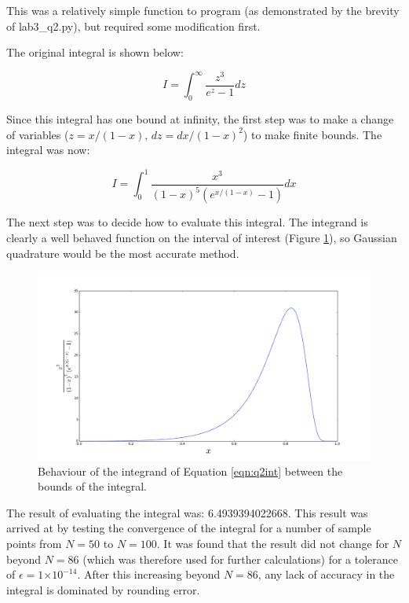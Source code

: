 \documentclass[a4paper,12pt]{article}
\providecommand{\e}[1]{\ensuremath{\times 10^{#1}}}
\begin{document}
This was a relatively simple function to program (as demonstrated by the brevity of lab3\_q2.py), but required some modification first. 

The original integral is shown below:

\begin{equation}
I = \int_0^{\infty}\frac{z^3}{e^z - 1}dz\nonumber
\end{equation}

Since this integral has one bound at infinity, the first step was to make a change of variables ($z = x/(1-x),\, dz = dx/(1-x)^2$) to make finite bounds. The integral was now:

\begin{equation}
I = \int_0^1\frac{x^3}{(1-x)^5 (e^{x/(1-x)}-1)}dx
\label{eqn:q2int}
\end{equation}

The next step was to decide how to evaluate this integral. The integrand is clearly a well behaved function on the interval of interest (Figure \ref{fig:q2meta}), so Gaussian quadrature would be the most accurate method. 

\begin{figure}[H]
\centering
\includegraphics[width = \linewidth]{lab3q2meta.png}
\caption{Behaviour of the integrand of Equation \ref{eqn:q2int} between the bounds of the integral.}
\label{fig:q2meta}
\end{figure}

The result of evaluating the integral was: 6.4939394022668. This result was arrived at by testing the convergence of the integral for a number of sample points from $N = 50$ to $N = 100$. It was found that the result did not change for $N$ beyond $N = 86$ (which was therefore used for further calculations) for a tolerance of $\epsilon = 1\e{-14}$. After this increasing beyond $N = 86$, any lack of accuracy in the integral is dominated by rounding error.
\end{document}

